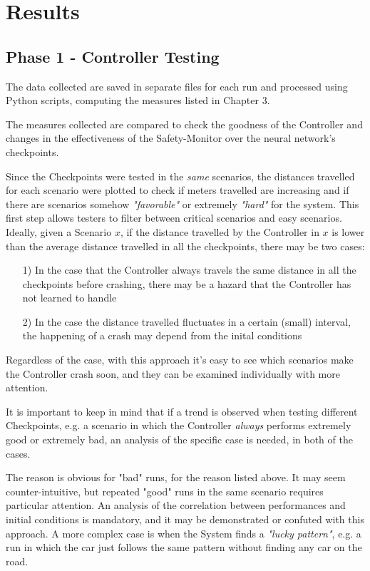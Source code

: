 \section{Results}

\subsection{Phase 1 - Controller Testing}

The data collected are saved in separate files for each run and processed using Python scripts, computing the measures listed in Chapter 3.

The measures collected are compared to check the goodness of the Controller and changes in the effectiveness of the Safety-Monitor over the neural network's checkpoints.

Since the Checkpoints were tested in the \textsl{same} scenarios, the distances travelled for each scenario were plotted to check if meters travelled are increasing and if there are scenarios somehow \textsl{"favorable"} or extremely \textsl{"hard"} for the system. This first step allows testers to filter between critical scenarios and easy scenarios. Ideally, given a Scenario $x$, if the distance travelled by the Controller in $x$ is lower than the average distance travelled in all the checkpoints, there may be two cases:

\begin{itemize}
	\item[1)] In the case that the Controller always travels the same distance in all the checkpoints before crashing, there may be a hazard that the Controller has not learned to handle
	\item[2)] In the case the distance travelled fluctuates in a certain (small) interval, the happening of a crash may depend from the inital conditions
\end{itemize}

Regardless of the case, with this approach it's easy to see which scenarios make the Controller crash soon, and they can be examined individually with more attention.

It is important to keep in mind that if a trend is observed when testing different Checkpoints, e.g. a scenario in which the Controller \textsl{always} performs extremely good or extremely bad, an analysis of the specific case is needed, in both of the cases.

The reason is obvious for "bad" runs, for the reason listed above. It may seem counter-intuitive, but repeated "good" runs in the same scenario requires particular attention. An analysis of the correlation between performances and initial conditions is mandatory, and it may be demonstrated or confuted with this approach. A more complex case is when the System finds a \textsl{"lucky pattern"}, e.g. a run in which the car just follows the same pattern without finding any car on the road. 


